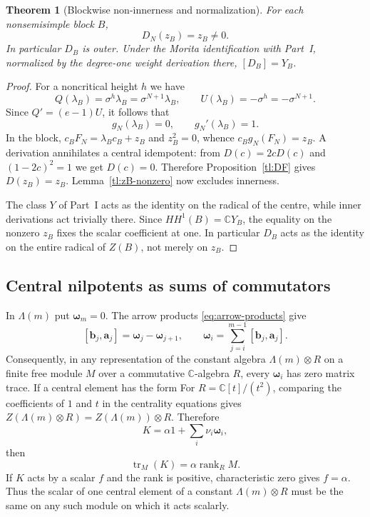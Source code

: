 \documentclass[a4paper,11pt,oneside,reqno]{amsart}
\newtheorem{theorem}{Theorem}[section]
\theoremstyle{definition}
\numberwithin{equation}{section}
\begin{document}
	\begin{theorem}[Blockwise non-innerness and normalization]\label{tl:block-D}
		For each nonsemisimple block $B$,
		\begin{equation}\label{tl:DzB}
			D_N(z_B)=z_B\ne0.
		\end{equation}
		In particular $D_B$ is outer.  Under the Morita identification with
		Part~I, normalized by the degree-one weight derivation there,
		$[D_B]=Y_B$.
	\end{theorem}
	\begin{proof}
		For a noncritical height $h$ we have
		\[
		Q(\lambda_B)=\sigma^h\lambda_B=\sigma^{N+1}\lambda_B,
		\qquad U(\lambda_B)=-\sigma^h=-\sigma^{N+1}.
		\]
		Since $Q'=(e-1)U$, it follows that
		\[
		g_N(\lambda_B)=0,\qquad g_N'(\lambda_B)=1.
		\]
		In the block, $c_BF_N=\lambda_Bc_B+z_B$ and $z_B^2=0$, whence
		$c_Bg_N(F_N)=z_B$.  A derivation annihilates a central idempotent:
		from $D(c)=2cD(c)$ and $(1-2c)^2=1$ we get $D(c)=0$.
		Therefore Proposition~\ref{tl:DF} gives $D(z_B)=z_B$.
		Lemma~\ref{tl:zB-nonzero} now excludes innerness.
		
		The class $Y$ of Part~I acts as the identity on the radical of the
		centre, while inner derivations act trivially there.
		Since $HH^1(B)=\mathbb CY_B$, the equality on the nonzero $z_B$
		fixes the scalar coefficient at one.  In particular $D_B$ acts as
		the identity on the entire radical of $Z(B)$, not merely on $z_B$.
	\end{proof}
	
	\subsection{Central nilpotents as sums of commutators}
	In $\Lambda(m)$ put $\boldsymbol{\omega}_m=0$.  The arrow products
	\eqref{eq:arrow-products} give
	\[
	[\mathbf{b}_j,\mathbf{a}_j]=\boldsymbol{\omega}_j-\boldsymbol{\omega}_{j+1},\qquad
	\boxed{\boldsymbol{\omega}_i=\sum_{j=i}^{m-1}[\mathbf{b}_j,\mathbf{a}_j].}
	\]
	Consequently, in any representation of the constant algebra
	$\Lambda(m)\otimes R$ on a finite free module $M$ over a commutative
	$\mathbb C$-algebra $R$, every $\boldsymbol{\omega}_i$ has zero matrix trace.
	If a central element has the form
	For $R=\mathbb C[t]/(t^2)$, comparing the coefficients of
$1$ and $t$ in the centrality equations gives
$Z(\Lambda(m)\otimes R)=Z(\Lambda(m))\otimes R$. Therefore
\begin{equation}\label{tl:central-over-R}
		K=\alpha1+\sum_i\nu_i \boldsymbol{\omega}_i,
	\end{equation}
	then
	\begin{equation}\label{tl:trace-test}
		\operatorname{tr}_M(K)=\alpha\operatorname{rank}_R M.
	\end{equation}
	If $K$ acts by a scalar $f$ and the rank is positive, characteristic
	zero gives $f=\alpha$.  Thus the scalar of one central element of a
	constant $\Lambda(m)\otimes R$ must be the same on any such module
	on which it acts scalarly.
	
\end{document}
